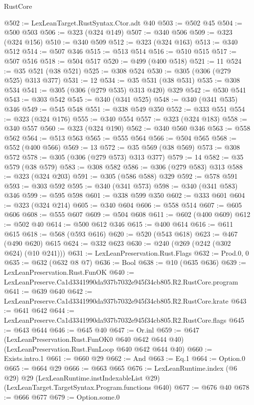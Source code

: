 \begin{lexlean}{RustCore}
\begin{coremodule}
@502 := LexLeanTarget.RustSyntax.Ctor.adt @40
@503 := @502 @45
@504 := @500 @503
@506 := @323 (@324 @149)
@507 := @340 @506
@509 := @323 (@324 @156)
@510 := @340 @509
@512 := @323 (@324 @163)
@513 := @340 @512
@514 := @507 @346
@515 := @513 @514
@516 := @510 @515
@517 := @507 @516
@518 := @504 @517
@520 := @499 (@400 @518)
@521 := 11
@524 := @35 @521 (@38 @521)
@525 := @308 @524
@530 := @305 (@306 (@279 @525) @313 @377)
@531 := 12
@534 := @35 @531 (@38 @531)
@535 := @308 @534
@541 := @305 (@306 (@279 @535) @313 @420) @329
@542 := @530 @541
@543 := @303 @542
@545 := @340 (@341 @525)
@548 := @340 (@341 @535) @346
@549 := @545 @548
@551 := @338 @549 @350
@552 := @333 @551
@554 := @323 (@324 @176)
@555 := @340 @554
@557 := @323 (@324 @183)
@558 := @340 @557
@560 := @323 (@324 @190)
@562 := @340 @560 @346
@563 := @558 @562
@564 := @513 @563
@565 := @555 @564
@566 := @504 @565
@568 := @552 (@400 @566)
@569 := 13
@572 := @35 @569 (@38 @569)
@573 := @308 @572
@578 := @305 (@306 (@279 @573) @313 @377)
@579 := 14
@582 := @35 @579 (@38 @579)
@583 := @308 @582
@586 := @306 (@279 @583) @313
@588 := @323 (@324 @203)
@591 := @305 (@586 @588) @329
@592 := @578 @591
@593 := @303 @592
@595 := @340 (@341 @573)
@598 := @340 (@341 @583) @346
@599 := @595 @598
@601 := @338 @599 @350
@602 := @333 @601
@604 := @323 (@324 @214)
@605 := @340 @604
@606 := @558 @514
@607 := @605 @606
@608 := @555 @607
@609 := @504 @608
@611 := @602 (@400 @609)
@612 := @502 @40
@614 := @500 @612 @346
@615 := @400 @614
@616 := @611 @615
@618 := @568 (@593 @616)
@620 := @520 (@543 @618)
@623 := @467 (@490 @620) @615
@624 := @332 @623
@630 := @240 (@269 (@242 (@302 @624) (@10 @241)))
@631 := LexLeanPreservation.Rust.Flags
@632 := Prod.{0, 0}
@635 := @632 (@632 @8 @7)
@636 := Bool
@638 := @10 (@635 @636)
@639 := LexLeanPreservation.Rust.FunOK
@640 := LexLeanPreserve.Ca1d3341990da937b7032e945f34cb805.R2.RustCore.program
@641 := @639 @640
@642 := LexLeanPreserve.Ca1d3341990da937b7032e945f34cb805.R2.RustCore.krate
@643 := @641 @642
@644 := LexLeanPreserve.Ca1d3341990da937b7032e945f34cb805.R2.RustCore.flags
@645 := @643 @644
@646 := @645 @40
@647 := Or.inl
@659 := @647
    (LexLeanPreservation.Rust.FunOK0 @640 @642 @644 @40)
    (LexLeanPreservation.Rust.FunLoop @640 @642 @644 @40)
@660 := Exists.intro.{1}
@661 := @660 @29
@662 := And
@663 := Eq.{1}
@664 := Option.{0}
@665 := @664 @29
@666 := @663 @665
@676 := LexLeanRuntime.index
    (@6 @29)
    @29
    (LexLeanRuntime.instIndexableList @29)
    (LexLeanTarget.TargetSyntax.Program.functions @640)
@677 := @676 @40
@678 := @666 @677
@679 := Option.some.{0}

\end{coremodule}
\end{lexlean}
